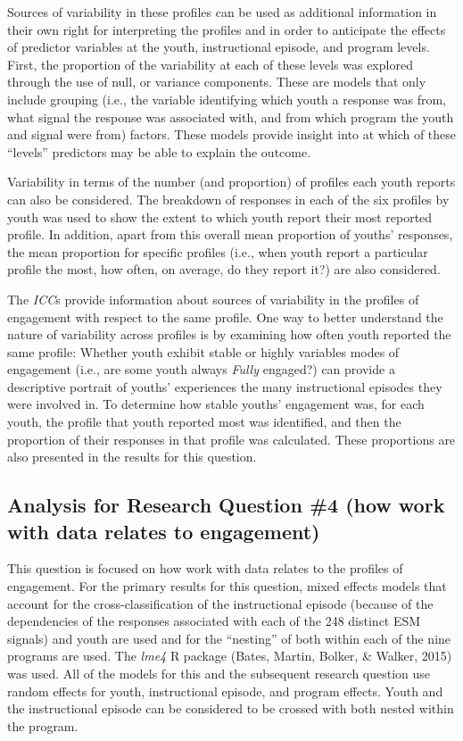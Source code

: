 \documentclass[]{msu-thesis}
\theoremstyle{definition}
\theoremstyle{definition}
\theoremstyle{definition}
\theoremstyle{remark}
\begin{document}
Sources of variability in these profiles can be used as additional
information in their own right for interpreting the profiles and in
order to anticipate the effects of predictor variables at the youth,
instructional episode, and program levels. First, the proportion of the
variability at each of these levels was explored through the use of
null, or variance components. These are models that only include
grouping (i.e., the variable identifying which youth a response was
from, what signal the response was associated with, and from which
program the youth and signal were from) factors. These models provide
insight into at which of these ``levels'' predictors may be able to
explain the outcome.

Variability in terms of the number (and proportion) of profiles each
youth reports can also be considered. The breakdown of responses in each
of the six profiles by youth was used to show the extent to which youth
report their most reported profile. In addition, apart from this overall
mean proportion of youths' responses, the mean proportion for specific
profiles (i.e., when youth report a particular profile the most, how
often, on average, do they report it?) are also considered.

The \emph{ICC}s provide information about sources of variability in the
profiles of engagement with respect to the same profile. One way to
better understand the nature of variability across profiles is by
examining how often youth reported the same profile: Whether youth
exhibit stable or highly variables modes of engagement (i.e., are some
youth always \emph{Fully} engaged?) can provide a descriptive portrait
of youths' experiences the many instructional episodes they were
involved in. To determine how stable youths' engagement was, for each
youth, the profile that youth reported most was identified, and then the
proportion of their responses in that profile was calculated. These
proportions are also presented in the results for this question.

\subsection{Analysis for Research Question \#4 (how work with data
relates to
engagement)}\label{analysis-for-research-question-4-how-work-with-data-relates-to-engagement}

This question is focused on how work with data relates to the profiles
of engagement. For the primary results for this question, mixed effects
models that account for the cross-classification of the instructional
episode (because of the dependencies of the responses associated with
each of the 248 distinct ESM signals) and youth are used and for the
``nesting'' of both within each of the nine programs are used. The
\emph{lme4} R package (Bates, Martin, Bolker, \& Walker, 2015) was used.
All of the models for this and the subsequent research question use
random effects for youth, instructional episode, and program effects.
Youth and the instructional episode can be considered to be crossed with
both nested within the program.
\end{document}
